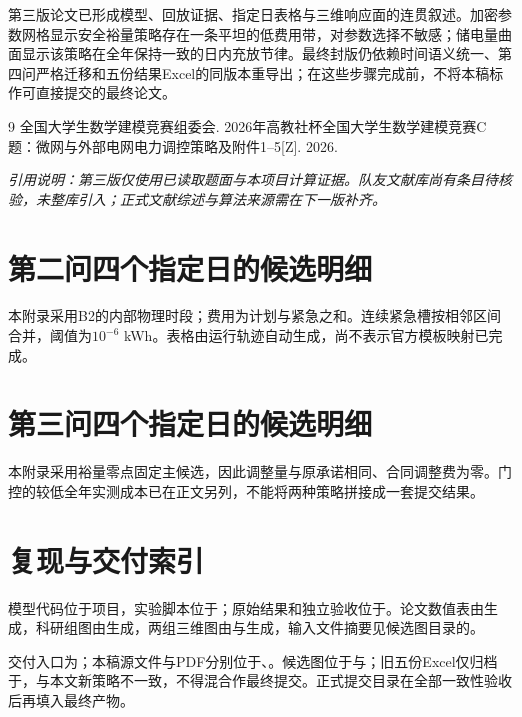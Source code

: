 \documentclass[UTF8,a4paper,zihao=-4,fontset=fandol]{ctexart}
\begin{document}
第三版论文已形成模型、回放证据、指定日表格与三维响应面的连贯叙述。加密参数网格显示安全裕量策略存在一条平坦的低费用带，对参数选择不敏感；储电量曲面显示该策略在全年保持一致的日内充放节律。最终封版仍依赖时间语义统一、第四问严格迁移和五份结果Excel的同版本重导出；在这些步骤完成前，不将本稿标作可直接提交的最终论文。

\begin{thebibliography}{9}
 全国大学生数学建模竞赛组委会. 2026年高教社杯全国大学生数学建模竞赛C题：微网与外部电网电力调控策略及附件1--5[Z]. 2026.
\end{thebibliography}
\noindent\textit{引用说明：第三版仅使用已读取题面与本项目计算证据。队友文献库尚有条目待核验，未整库引入；正式文献综述与算法来源需在下一版补齐。}

\appendix
\section{第二问四个指定日的候选明细}
本附录采用B2的内部物理时段；费用为计划与紧急之和。连续紧急槽按相邻区间合并，阈值为$10^{-6}$ kWh。表格由运行轨迹自动生成，尚不表示官方模板映射已完成。

\section{第三问四个指定日的候选明细}
本附录采用裕量零点固定主候选，因此调整量与原承诺相同、合同调整费为零。门控的较低全年实测成本已在正文另列，不能将两种策略拼接成一套提交结果。

\section{复现与交付索引}
模型代码位于项目，实验脚本位于；原始结果和独立验收位于。论文数值表由生成，科研组图由生成，两组三维图由与生成，输入文件摘要见候选图目录的。

交付入口为；本稿源文件与PDF分别位于、。候选图位于与；旧五份Excel仅归档于，与本文新策略不一致，不得混合作最终提交。正式提交目录在全部一致性验收后再填入最终产物。
\end{document}
